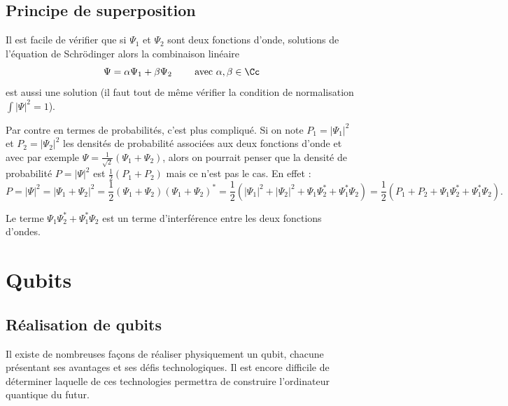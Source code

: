\documentclass[11pt,class=report,crop=false]{standalone}
\begin{document}
\subsection{Principe de superposition}


Il est facile de vérifier que si $\Psi_1$ et $\Psi_2$ sont deux fonctions d'onde, solutions de l'équation de Schrödinger alors la combinaison linéaire 
$$\Psi = \alpha \Psi_1 + \beta \Psi_2 \qquad \text{ avec } \alpha, \beta \in \Cc$$ est aussi une solution (il faut tout de même vérifier la condition de normalisation $\int |\Psi|^2 = 1$).

Par contre en termes de probabilités, c'est plus compliqué. Si on note $P_1 = |\Psi_1|^2$ et $P_2 = |\Psi_2|^2$ les densités de probabilité associées aux deux fonctions d'onde et avec par exemple $\Psi = \frac{1}{\sqrt2} (\Psi_1+\Psi_2)$, 
alors on pourrait penser que la densité de probabilité $P = |\Psi|^2$ est $\frac12(P_1+P_2)$ mais ce n'est pas le cas. En effet :
$$P = |\Psi|^2 = |\Psi_1+\Psi_2|^2 = \frac12(\Psi_1+\Psi_2)(\Psi_1+\Psi_2)^*
= \frac12(|\Psi_1|^2+|\Psi_2|^2 + \Psi_1\Psi_2^* + \Psi_1^*\Psi_2)
= \frac12(P_1+P_2 + \Psi_1\Psi_2^* + \Psi_1^*\Psi_2).$$

Le terme $\Psi_1\Psi_2^* + \Psi_1^*\Psi_2$ est un terme d'interférence entre les deux fonctions d'ondes.


\section{Qubits}

\subsection{Réalisation de qubits}


Il existe de nombreuses façons de réaliser physiquement un qubit, chacune présentant ses avantages et ses défis technologiques. Il est encore difficile de déterminer laquelle de ces technologies permettra de construire l'ordinateur quantique du futur. 
\end{document}
